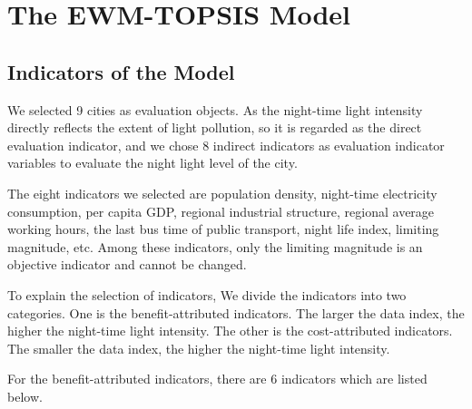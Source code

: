 \MinParskip{}

\section{The EWM-TOPSIS Model}

\subsection{Indicators of the Model}
We selected 9 cities as evaluation objects. As the night-time light intensity directly reflects the extent of light pollution, so it is regarded as the direct evaluation indicator, and we chose 8 indirect indicators as evaluation indicator variables to evaluate the night light level of the city.

The eight indicators we selected are population density, night-time electricity consumption, per capita GDP, regional industrial structure, regional average working hours, the last bus time of public transport, night life index, limiting magnitude, etc. Among these indicators, only the limiting magnitude is an objective indicator and cannot be changed.

To explain the selection of indicators, We divide the indicators into two categories. One is the benefit-attributed indicators. The larger the data index, the higher the night-time light intensity. The other is the cost-attributed indicators. The smaller the data index, the higher the night-time light intensity.

For the benefit-attributed indicators, there are 6 indicators which are listed below.

